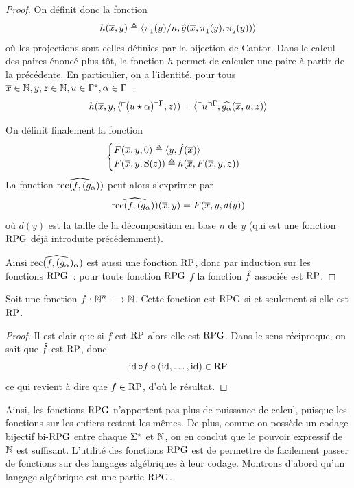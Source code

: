 \begin{proof}
  On définit donc la fonction
  \[h(\overline{x},y) \triangleq
  \langle\mathop{\pi_{1}^{}}(y)/n,
  \hat{g}(\overline{x},\mathop{\pi_{1}^{}}(y),\mathop{\pi_{2}^{}}(y))\rangle\]
  où les projections sont celles définies par la bijection de Cantor. Dans le
  calcul des paires énoncé plus tôt, la fonction $h$ permet de calculer une
  paire à partir de la précédente. En particulier, on a l'identité, pour
  tous $\overline{x} \in \mathbb N, y,z\in \mathbb N, u \in \Gamma^{\star}, \alpha \in \Gamma$~:
  \[h(\overline{x},y,\langle \ulcorner(u\mathbin{\star} \alpha)\urcorner^{\Gamma},z\rangle) =
  \langle \ulcorner u\urcorner^{\Gamma},\widehat{g_\alpha}(\overline{x},u,z)\rangle\]
  
  On définit finalement la fonction
  \[\begin{cases}
  F(\overline{x},y,0) \triangleq \langle y,\hat{f}(\overline{x})\rangle\\
  F(\overline{x},y,\operatorname{S}(z)) \triangleq h(\overline{x},F(\overline{x},y,z))
  \end{cases}\]
  La fonction $\widehat{\operatorname{rec}(f,(g_{\alpha}))}$ peut alors s'exprimer par
  \[\widehat{\operatorname{rec}(f,(g_{\alpha}))}(\overline{x},y) = F(\overline{x},y,d(y))\]
  où $d(y)$ est la taille de la décomposition en base $n$ de $y$ (qui est une
  fonction $\operatorname{RPG}$ déjà introduite précédemment).
  
  Ainsi $\widehat{\operatorname{rec}(f,(g_\alpha)_\alpha)}$ est aussi une fonction $\operatorname{RP}$, donc
  par induction sur les fonctions $\operatorname{RPG}$~: pour toute fonction $\operatorname{RPG}$ $f$ la
  fonction $\hat{f}$ associée est $\operatorname{RP}$.
\end{proof}

\begin{theorem}
  Soit une fonction $f : \displaystyle \mathbb N^n \longrightarrow \mathbb N$. Cette fonction est $\operatorname{RPG}$ si
  et seulement si elle est $\operatorname{RP}$.
\end{theorem}

\begin{proof}
  Il est clair que si $f$ est $\operatorname{RP}$ alors elle est $\operatorname{RPG}$. Dans le sens
  réciproque, on sait que $\hat{f}$ est $\operatorname{RP}$, donc
  \[\operatorname{id}\circ f \circ (\operatorname{id},\ldots,\operatorname{id}) \in \operatorname{RP}\]
  ce qui revient à dire que $f \in \operatorname{RP}$, d'où le résultat.
\end{proof}

Ainsi, les fonctions $\operatorname{RPG}$ n'apportent pas plus de puissance de calcul, puisque
les fonctions sur les entiers restent les mêmes. De plus, comme on possède un
codage bijectif bi-$\operatorname{RPG}$ entre chaque $\Sigma^{\star}$ et $\mathbb N$, on en conclut que le
pouvoir expressif de $\mathbb N$ est suffisant. L'utilité des fonctions $\operatorname{RPG}$ est de
permettre de facilement passer de fonctions sur des langages algébriques à leur
codage. Montrons d'abord qu'un langage algébrique est une partie $\operatorname{RPG}$.

